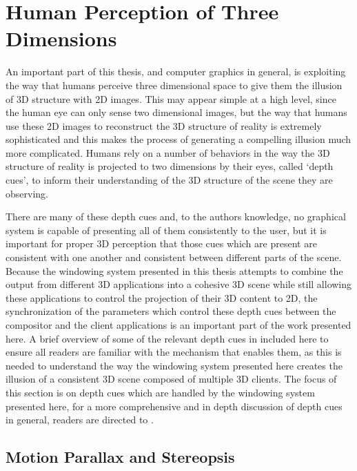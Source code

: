 \section{Human Perception of Three Dimensions}
\label{sec:depth-perception}

An important part of this thesis, and computer graphics in general, is exploiting the way that humans perceive three dimensional space to give them the illusion of 3D structure with 2D images. This may appear simple at a high level, since the human eye can only sense two dimensional images, but the way that humans use these 2D images to reconstruct the 3D structure of reality is extremely sophisticated and this makes the process of generating a compelling illusion much more complicated. Humans rely on a number of behaviors in the way the 3D structure of reality is projected to two dimensions by their eyes, called ‘depth cues’, to inform their understanding of the 3D structure of the scene they are observing.
	
There are many of these depth cues and, to the authors knowledge, no graphical system is capable of presenting all of them consistently to the user, but it is important for proper 3D perception that those cues which are present are consistent with one another and consistent between different parts of the scene. Because the windowing system presented in this thesis attempts to combine the output from different 3D applications into a cohesive 3D scene while still allowing these applications to control the projection of their 3D content to 2D, the synchronization of the parameters which control these depth cues between the compositor and the client applications is an important part of the work presented here. A brief overview of some of the relevant depth cues in included here to ensure all readers are familiar with the mechanism that enables them, as this is needed to understand the way the windowing system presented here creates the illusion of a consistent 3D scene composed of multiple 3D clients. The focus of this section is on depth cues which are handled by the windowing system presented here, for a more comprehensive and in depth discussion of depth cues in general, readers are directed to \cite{depth-cues}.

\subsection{Motion Parallax and Stereopsis}
\label{sec:motion-parallax-and-stereopsis}

